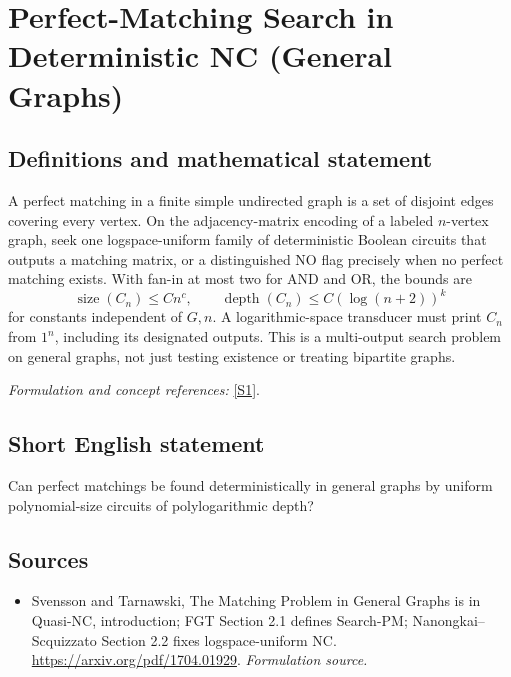 \documentclass[11pt]{article}
\begin{document}
\section*{\texorpdfstring{Perfect-Matching Search in Deterministic NC (General Graphs)}{Perfect-Matching Search in Deterministic NC (General Graphs)}}\label{30006800}
\subsection{Definitions and mathematical statement}
A perfect matching in a finite simple undirected graph is a set of disjoint edges covering every vertex. On the adjacency-matrix encoding of a labeled $n$-vertex graph, seek one logspace-uniform family of deterministic Boolean circuits that outputs a matching matrix, or a distinguished NO flag precisely when no perfect matching exists. With fan-in at most two for AND and OR, the bounds are
\[
 \operatorname{size}(C_n)\le Cn^c,\qquad
 \operatorname{depth}(C_n)\le C(\log(n+2))^k
\]
for constants independent of $G,n$. A logarithmic-space transducer must print $C_n$ from $1^n$, including its designated outputs. This is a multi-output search problem on general graphs, not just testing existence or treating bipartite graphs.
\par\smallskip\textit{Formulation and concept references:} \href{https://arxiv.org/pdf/1704.01929}{[S1]}.

\subsection{Short English statement}
Can perfect matchings be found deterministically in general graphs by uniform polynomial-size circuits of polylogarithmic depth?
\subsection{Sources}
\begin{itemize}
\item[S1]Svensson and Tarnawski, The Matching Problem in General Graphs is in Quasi-NC, introduction; FGT Section 2.1 defines Search-PM; Nanongkai–Scquizzato Section 2.2 fixes logspace-uniform NC.
\url{https://arxiv.org/pdf/1704.01929}.
\textit{Formulation source.}
\end{itemize}
\end{document}
